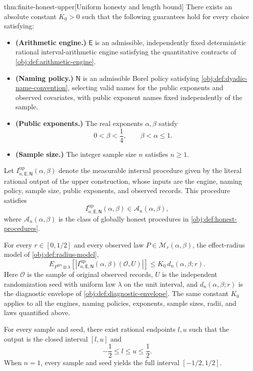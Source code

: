 \documentclass[11pt]{article}
\begin{document}
\begin{theoremv}{thm:finite-honest-upper}[Uniform honesty and length bound]
There exists an absolute constant \(K_0>0\) such that the following guarantees hold for every choice satisfying:
\begin{itemize}
\item \textbf{(Arithmetic engine.)} \(\mathsf E\) is an admissible, independently fixed deterministic rational interval-arithmetic engine satisfying the quantitative contracts of \cref{obj:def:arithmetic-engine}.
\item \textbf{(Naming policy.)} \(\mathsf N\) is an admissible Borel policy satisfying \cref{obj:def:dyadic-name-convention}, selecting valid names for the public exponents and observed covariates, with public exponent names fixed independently of the sample.
\item \textbf{(Public exponents.)} The real exponents \(\alpha,\beta\) satisfy
\[
0<\beta<\frac14,\qquad \beta<\alpha\le1.
\]
\item \textbf{(Sample size.)} The integer sample size \(n\) satisfies \(n\ge1\).
\end{itemize}

Let \(I^{\mathrm{up}}_{n,\mathsf E,\mathsf N}(\alpha,\beta)\) denote the measurable interval procedure given by the literal rational output of the upper construction, whose inputs are the engine, naming policy, sample size, public exponents, and observed records. This procedure satisfies
\[
I^{\mathrm{up}}_{n,\mathsf E,\mathsf N}(\alpha,\beta)
\in\mathcal A_n(\alpha,\beta),
\]
where \(\mathcal A_n(\alpha,\beta)\) is the class of globally honest procedures in \cref{obj:def:honest-procedures}.

For every \(r\in[0,1/2]\) and every observed law \(P\in\mathcal M_r(\alpha,\beta)\), the effect-radius model of \cref{obj:def:radius-model},
\[
E_{P^{\otimes n}\otimes\lambda}
\left[
\left|I^{\mathrm{up}}_{n,\mathsf E,\mathsf N}(\alpha,\beta)(\mathcal O,U)\right|
\right]
\le K_0\,d_n(\alpha,\beta;r).
\]
Here \(\mathcal O\) is the sample of original observed records, \(U\) is the independent randomization seed with uniform law \(\lambda\) on the unit interval, and \(d_n(\alpha,\beta;r)\) is the diagnostic envelope of \cref{obj:def:diagnostic-envelope}. The same constant \(K_0\) applies to all the engines, naming policies, exponents, sample sizes, radii, and laws quantified above.

For every sample and seed, there exist rational endpoints \(l,u\) such that the output is the closed interval \([l,u]\) and
\[
-\frac12\le l\le u\le\frac12.
\]
When \(n=1\), every sample and seed yields the full interval \([-1/2,1/2]\).
\end{theoremv}
\end{document}
